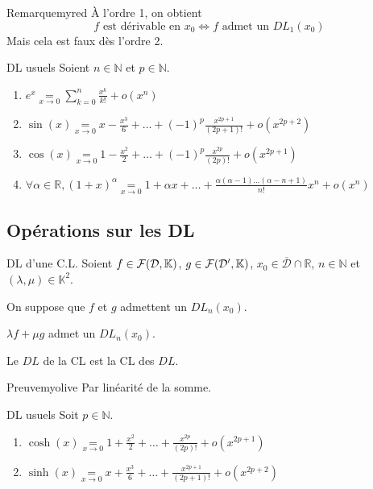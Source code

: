     \begin{omed}{Remarque}{myred}
        À l’ordre 1, on obtient 
        \[ f \text{ est dérivable en } x_0 \iff f \text{ admet un } DL_1(x_0) \]
        Mais cela est faux dès l’ordre 2.
    \end{omed}

    \begin{coro}{DL usuels}{}
        Soient $n\in \mathbb{N}$ et $p \in \mathbb{N}$.
        \begin{enumerate}
            \item $ e^x \underset{x \rightarrow 0}{=} \sum\limits_{k=0}^n \frac{x^k}{k!} + o(x^n)$
            \item $\sin(x) \underset{x \rightarrow 0}{=} x - \frac{x^3}{6} + \ldots + (-1)^p \frac{x^{2p+1}}{(2p+1)!} + o(x^{2p+2})$
            \item $\cos(x) \underset{x \rightarrow 0}{=} 1 - \frac{x^2}{2} + \ldots + (-1)^p \frac{x^{2p}}{(2p)!} + o(x^{2p+1})$
            \item $\forall \alpha \in \mathbb{R},(1+x)^{\alpha} \underset{x \rightarrow 0}{=} 1 + \alpha x + \ldots + \frac{\alpha(\alpha - 1)\ldots(\alpha -n + 1)}{n!}x^n + o(x^n)$
        \end{enumerate}
    \end{coro}

\subsection{Opérations sur les DL}

    \begin{prop}{DL d’une C.L.}{}
        Soient $f \in \mathcal{F}(\mathcal{D},\mathbb{K})$, $g \in \mathcal{F}(\mathcal{D'},\mathbb{K})$, $x_0 \in \overline{\mathcal{D}} \cap \mathbb{R}$, $n \in \mathbb{N}$ et $(\lambda,\mu) \in \mathbb{K}^2$.

        On suppose que $f$ et $g$ admettent un $DL_n(x_0)$.

        \begin{alors}
            \item $\lambda f + \mu g$ admet un $DL_n(x_0)$.
            \item Le $DL$ de la CL est la CL des $DL$.
        \end{alors}
    \end{prop}

    \begin{demo}{Preuve}{myolive}
        Par linéarité de la somme.
    \end{demo}

    \begin{coro}{DL usuels}{}
        Soit $p \in \mathbb{N}$.
        \begin{enumerate}
            \item $\cosh(x) \underset{x \rightarrow 0}{=} 1 + \frac{x^2}{2} + \ldots + \frac{x^{2p}}{(2p)!} + o(x^{2p+1})$
            \item $\sinh(x) \underset{x \rightarrow 0}{=} x + \frac{x^3}{6} + \ldots + \frac{x^{2p+1}}{(2p+1)!} + o(x^{2p+2})$
        \end{enumerate}
    \end{coro}

